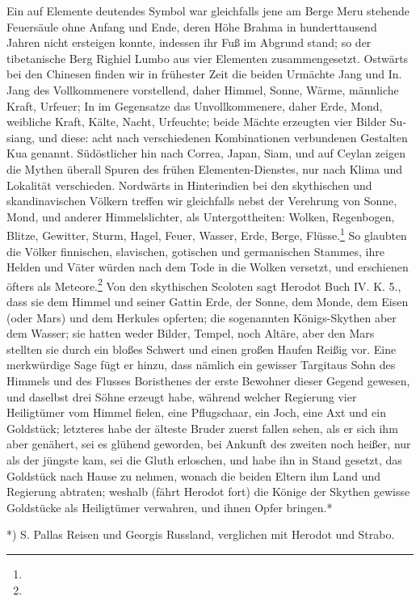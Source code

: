 \documentclass[a4paper, 11pt, oneside, polutonikogreek, german]{article}
\begin{document}
Ein auf Elemente deutendes Symbol war gleichfalls jene am Berge Meru stehende Feuersäule ohne Anfang und Ende, deren Höhe Brahma in hunderttausend Jahren nicht ersteigen konnte, indessen ihr Fuß im Abgrund stand; so der tibetanische Berg Righiel Lumbo aus vier Elementen zusammengesetzt. Ostwärts bei den Chinesen finden wir in frühester Zeit die beiden Urmächte Jang und In. Jang des Vollkommenere vorstellend, daher Himmel, Sonne, Wärme, männliche Kraft, Urfeuer; In im Gegensatze das Unvollkommenere, daher Erde, Mond, weibliche Kraft, Kälte, Nacht, Urfeuchte; beide Mächte erzeugten vier Bilder Su-siang, und diese: acht nach verschiedenen Kombinationen verbundenen Gestalten Kua genannt. Südöstlicher hin nach Correa, Japan, Siam, und auf Ceylan zeigen die Mythen überall Spuren des frühen Elementen-Dienstes, nur nach Klima und Lokalität verschieden. Nordwärts in Hinterindien bei den skythischen und skandinavischen Völkern treffen wir gleichfalls nebst der Verehrung von Sonne, Mond, und anderer Himmelslichter, als Untergottheiten: Wolken, Regenbogen, Blitze, Gewitter, Sturm, Hagel, Feuer, Wasser, Erde, Berge, Flüsse.\footnote{} So glaubten die Völker finnischen, slavischen, gotischen und germanischen Stammes, ihre Helden und Väter würden nach dem Tode in die Wolken versetzt, und erschienen öfters als Meteore.\footnote{} Von den skythischen Scoloten sagt Herodot Buch IV. K. 5., dass sie dem Himmel und seiner Gattin Erde, der Sonne, dem Monde, dem Eisen (oder Mars) und dem Herkules opferten; die sogenannten Königs-Skythen aber dem Wasser; sie hatten weder Bilder, Tempel, noch Altäre, aber den Mars stellten sie durch ein bloßes Schwert und einen großen Haufen Reißig vor. Eine merkwürdige Sage fügt er hinzu, dass nämlich ein gewisser Targitaus Sohn des Himmels und des Flusses Boristhenes der erste Bewohner dieser Gegend gewesen, und daselbst drei Söhne erzeugt habe, während welcher Regierung vier Heiligtümer vom Himmel fielen, eine Pflugschaar, ein Joch, eine Axt und ein Goldstück; letzteres habe der älteste Bruder zuerst fallen sehen, als er sich ihm aber genähert, sei es glühend geworden, bei Ankunft des zweiten noch heißer, nur als der jüngste kam, sei die Gluth erloschen, und habe ihn in Stand gesetzt, das Goldstück nach Hause zu nehmen, wonach die beiden Eltern ihm Land und Regierung abtraten; weshalb (fährt Herodot fort) die Könige der Skythen gewisse Goldstücke als Heiligtümer verwahren, und ihnen Opfer bringen.*

*) S. Pallas Reisen und Georgis Russland, verglichen mit Herodot und Strabo.
\end{document}
